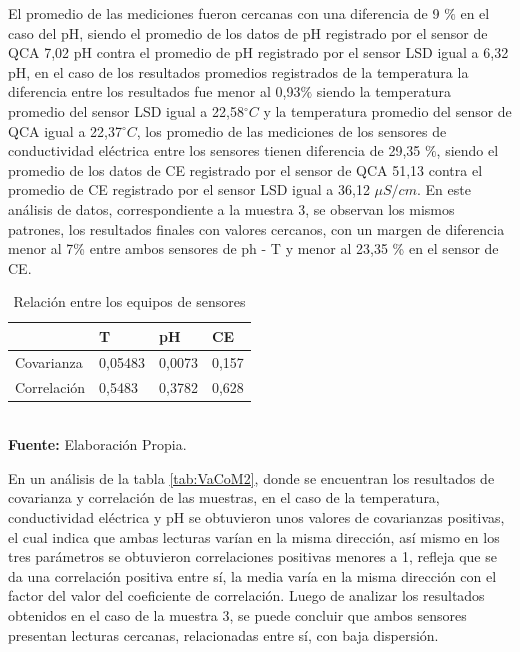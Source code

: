 El promedio de las mediciones fueron cercanas con una diferencia de 9 $\%$ en el caso del pH, siendo el promedio de los datos de pH registrado por el sensor de QCA 7,02 pH contra el promedio de pH registrado por el sensor LSD igual a 6,32 pH, en el caso de los resultados promedios registrados de la temperatura la diferencia entre los resultados fue menor al 0,93$\%$ siendo la temperatura promedio del sensor LSD igual a 22,58$ ^{\circ}C$ y la temperatura promedio del sensor de QCA igual a 22,37$^{\circ}C$, los promedio de las mediciones de los sensores de conductividad eléctrica entre los sensores tienen diferencia de 29,35 $\%$, siendo el promedio de los datos de CE registrado por el sensor de QCA 51,13 contra el promedio de CE registrado por el sensor LSD igual a 36,12 $\mu S/cm$.
En este an\'alisis de datos, correspondiente a la muestra 3, se observan los mismos patrones, los resultados finales con valores cercanos, con un margen de diferencia menor al 7\% entre ambos sensores de ph - T y menor al 23,35 \% en el sensor de CE.

\begin{table}[H]
\caption{Relaci\'on entre los equipos de sensores}
\label{tab:VaCoM3}
\centering
\begin{tabular}{llll} 
\toprule
& T   &  pH    & CE \\
\midrule
Covarianza  & 0,05483 & 0,0073 & 0,157                \\
Correlación & 0,5483& 0,3782 & 0,628        \\
\bottomrule
\end{tabular}
\\ \textbf{Fuente: }Elaboración Propia.
\end{table}  

En un an\'alisis de la tabla \ref{tab:VaCoM2}, donde se encuentran los resultados de covarianza y correlación de las muestras, en el caso de la temperatura, conductividad el\'ectrica y pH se obtuvieron unos valores de covarianzas positivas, el cual indica que ambas lecturas varían en la misma dirección, as\'i mismo en los tres par\'ametros se obtuvieron correlaciones positivas menores a 1, refleja que se da una correlación positiva entre sí, la media varía en la misma dirección con el factor del valor del coeficiente de correlación. Luego de analizar los resultados obtenidos en el caso de la muestra 3, se puede concluir que ambos sensores presentan lecturas cercanas, relacionadas entre s\'i, con baja dispersi\'on. 
